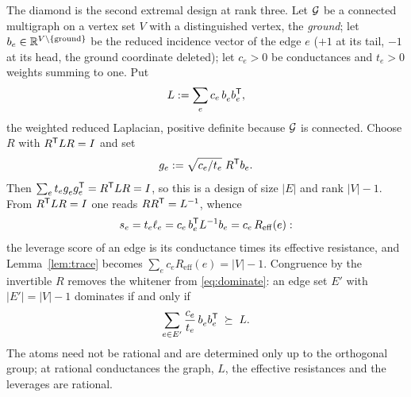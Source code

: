 The diamond is the second extremal design at rank three.  Let $\mathcal{G}$ be a
connected multigraph on a vertex set $V$ with a distinguished vertex, the
\emph{ground}; let $b_e\in\mathbb{R}^{V\setminus\{\mathrm{ground}\}}$ be the reduced
incidence vector of the edge $e$ ($+1$ at its tail, $-1$ at its head, the
ground coordinate deleted); let $c_e>0$ be conductances and $t_e>0$ weights
summing to one.  Put
\[
  L:=\sum_e c_e\,b_e^{\vphantom{\mathsf{T}}}b_e\tp,
\]
the weighted reduced Laplacian, positive definite because $\mathcal{G}$ is connected.
Choose $R$ with $R^{\mathsf{T}} LR=I$ and set
\begin{equation}\label{eq:graphicatom}
  g_e:=\sqrt{c_e/t_e}\;R^{\mathsf{T}} b_e .
\end{equation}
Then $\sum_e t_e g_e^{\vphantom{\mathsf{T}}}g_e\tp=R\tp LR=I$, so this is a design of
size $\lvert E\rvert$ and rank $\lvert V\rvert-1$.  From $R^{\mathsf{T}} LR=I$ one reads
$RR^{\mathsf{T}}=L^{-1}$, whence
\begin{equation}\label{eq:graphicleverage}
  s_e=t_e\ell_e=c_e\,b_e^{\mathsf{T}} L^{-1}b_e=c_e\,R_{\mathrm{eff}}(e) :
\end{equation}
the leverage score of an edge is its conductance times its effective
resistance, and Lemma~\ref{lem:trace} becomes
$\sum_e c_eR_{\mathrm{eff}}(e)=\lvert V\rvert-1$.  Congruence by the invertible
$R$ removes the whitener from \eqref{eq:dominate}: an edge set $E'$ with
$\lvert E'\rvert=\lvert V\rvert-1$ dominates if and only if
\begin{equation}\label{eq:graphicdominate}
  \sum_{e\in E'}\frac{c_e}{t_e}\,b_e^{\vphantom{\mathsf{T}}}b_e\tp\;\psd\;L .
\end{equation}
The atoms need not be rational and are determined only up to the orthogonal
group; at rational conductances the graph, $L$, the effective resistances and
the leverages are rational.

